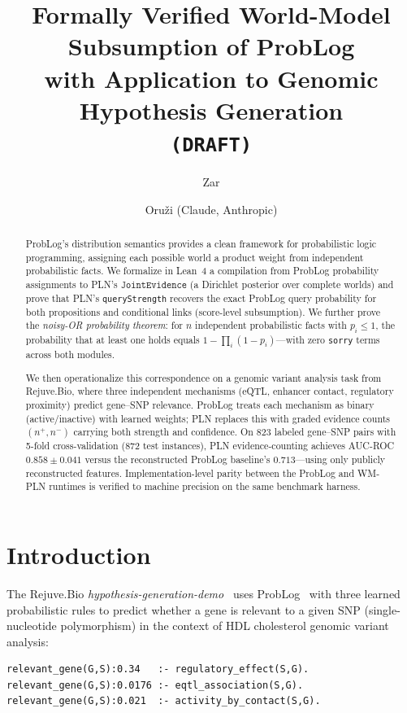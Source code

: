 \documentclass[]{article}
\title{Formally Verified World-Model Subsumption of ProbLog\\
  with Application to Genomic Hypothesis Generation\\[6pt]
  \texttt{(DRAFT)}}
\author{Zar \and Oru\v{z}i (Claude, Anthropic)}
\newcommand{\code}[1]{\texttt{#1}}
\newcommand{\ty}[1]{\ensuremath{\mathtt{#1}}}
\newcommand{\JointEvidence}{\ty{JointEvidence}}
\newcommand{\nplus}{\ensuremath{n^{+}}}
\newcommand{\nminus}{\ensuremath{n^{-}}}
\begin{document}
\maketitle

\begin{abstract}
ProbLog's distribution semantics provides a clean framework for probabilistic
logic programming, assigning each possible world a product weight from independent
probabilistic facts.  We formalize in Lean~4 a compilation from ProbLog probability
assignments to PLN's \JointEvidence{} (a Dirichlet posterior over complete worlds)
and prove that PLN's \code{queryStrength} recovers the exact ProbLog query probability
for both propositions and conditional links (score-level subsumption).
We further prove the
\emph{noisy-OR probability theorem}: for $n$ independent probabilistic facts with
$p_i \le 1$, the probability that at least one holds equals
$1 - \prod_i (1 - p_i)$---with zero \code{sorry} terms across both modules.

We then operationalize this correspondence on a genomic variant analysis task from
Rejuve.Bio, where three independent mechanisms (eQTL, enhancer contact, regulatory
proximity) predict gene--SNP relevance.  ProbLog treats each mechanism as binary
(active/inactive) with learned weights; PLN replaces this with graded evidence
counts $(\nplus, \nminus)$ carrying both strength and confidence.
On 823 labeled gene--SNP pairs with 5-fold cross-validation (872 test instances),
PLN evidence-counting achieves AUC-ROC $0.858 \pm 0.041$ versus the
reconstructed ProbLog baseline's $0.713$---using only publicly reconstructed
features.  Implementation-level parity between the ProbLog and WM-PLN runtimes
is verified to machine precision on the same benchmark harness.
\end{abstract}

\section{Introduction}
\label{sec:intro}

The Rejuve.Bio \emph{hypothesis-generation-demo}~\cite{RejuveBioHypGen2025} uses
ProbLog~\cite{DeRaedt2007ProbLog} with three learned probabilistic rules to predict
whether a gene is relevant to a given SNP (single-nucleotide polymorphism) in the
context of HDL cholesterol genomic variant analysis:

\begin{lstlisting}[caption={ProbLog rules from \code{pl\_rules.pl}},label=lst:problog-rules]
relevant_gene(G,S):0.34   :- regulatory_effect(S,G).
relevant_gene(G,S):0.0176 :- eqtl_association(S,G).
relevant_gene(G,S):0.021  :- activity_by_contact(S,G).
\end{lstlisting}
\end{document}
